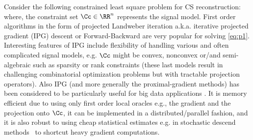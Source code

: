 Consider the following constrained least square problem for CS reconstruction:
where, the constraint set $\Cc\in \RR^n$ represents the signal model. First order algorithms in the form of projected Landweber iteration a.k.a. iterative projected gradient (IPG) descent or Forward-Backward are very popular for solving \eqref{eq:p1}. 
Interesting features of IPG include flexibility of handling various and often complicated signal models, e.g. $\Cc$ might be convex, nonconvex or/and semi-algebraic such as sparsity or rank constraints (these last models result in challenging combinatorial optimization problems but with tractable projection operators).  
Also IPG (and more generally the proximal-gradient methods) has been considered to be particularly useful for big data applications \cite{Volkan:bigdata}. It is memory efficient due to using only first order local oracles e.g., the gradient and the projection onto $\Cc$, it can be implemented in a distributed/parallel fashion, and it is also robust to using cheap statistical estimates e.g. in stochastic descend methods~\cite{Bottou:SGD} to shortcut heavy gradient computations.%


